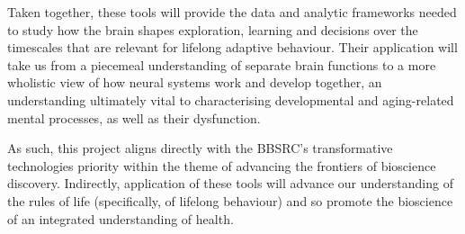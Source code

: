 Taken together, these tools will provide the data and analytic frameworks
needed to study  how the brain shapes exploration, learning and decisions over
the timescales that are relevant for lifelong adaptive behaviour.  Their
application will take us from a piecemeal understanding of separate brain
functions to a more wholistic view of how neural systems work and develop
together, an understanding ultimately vital to characterising developmental and
aging-related mental processes, as well as their dysfunction.

As such, this project aligns directly with the BBSRC's transformative
technologies priority within the theme of advancing the frontiers of bioscience
discovery.  Indirectly, application of these tools will advance our
understanding of the rules of life (specifically, of lifelong behaviour) and so
promote the bioscience of an integrated understanding of health.


